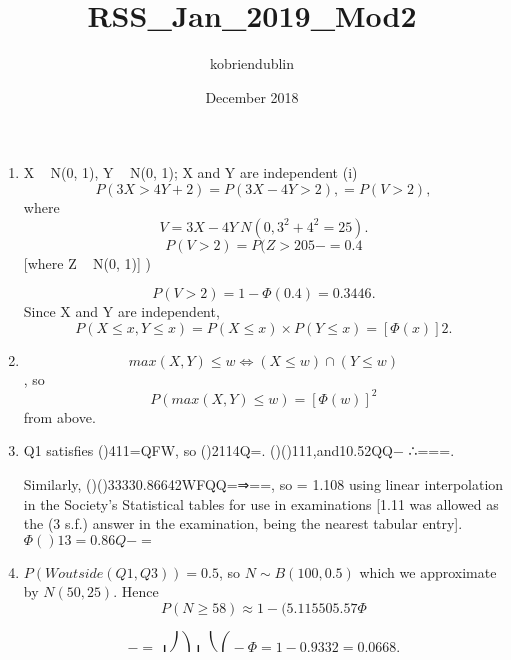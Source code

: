 \documentclass{article}
\title{RSS_Jan_2019_Mod2}
\author{kobriendublin }
\date{December 2018}
\begin{document}

\begin{enumerate}
    \item 
X ~ N(0, 1), Y ~ N(0, 1); X and Y are independent
(i)\[ P(3X > 4Y + 2) = P(3X − 4Y > 2),
= P(V > 2),\] where \[V = 3X − 4Y ~ N(0, 3^2 + 4^2 = 25).\]
\[P(V > 2) = P(Z > 205− = 0.4\] [where Z ~ N(0, 1)] ) 

\[P(V > 2)  = 1 − \Phi(0.4) = 0.3446.\]
Since X and Y are independent, 
\[P(X \leq x, Y \leq x) = P(X \leq x)\times P(Y \leq x) = [\Phi(x)]2.\]
    \item \[max(X, Y) \leq w ⇔ (X \leq w)∩(Y \leq w)\],
so \[P(max(X, Y) \leq w) = [\Phi(w)]^2\] from above.
    \item Q1 satisfies ()411=QFW, so ()2114Q\Phi=.
()()111,and10.52QQ− ∴\Phi==\Phi=.

Similarly, ()()33330.86642WFQQ=⇒\Phi==, so = 1.108 using linear interpolation in the Society's Statistical tables for use in examinations [1.11 was allowed as the (3 s.f.) answer in the examination, being the nearest tabular entry]. $\Phi()13 = 0.86Q−=$
    \item $P(W outside (Q1, Q3)) = 0.5$, so $N \sim B(100, 0.5)$ which we approximate by $N(50, 25)$. 
    Hence
\[P(N ≥ 58) \approx 1 − (
5.115505.57\Phi\]


\[−=⎟⎠⎞⎜⎝⎛−\Phi = 1 − 0.9332 = 0.0668.\]
\end{enumerate}
\end{document}
